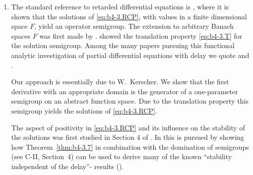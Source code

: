 \begin{enumerate}[label=\emph{Section \arabic*:}, wide, itemsep=1ex]
\item The standard reference to retarded differential equations is \citet{hale:1977}, where it is shown that the solutions of \eqref{eq:b4-3.RCP}, with values in a finite dimensional space $F$, yield an operator semigroup. 
The extension to arbitrary Banach spaces $F$ was first made by \citet{traviswebb:1974}. 
\citet{plant:1977} showed the translation property \eqref{eq:b4-3.T} for the solution semigroup. 
Among the many papers pursuing this functional analytic investigation of partial differential equations with delay we quote \citet{diblasioetal:1984} and \citet{kunischschappacher:1983}.

Our approach is essentially due to W.~Kerscher. 
We show that the first derivative with an appropriate domain is the generator of a one-parameter semigroup on an abstract function space. 
Due to the translation property this semigroup yields the solutions of \eqref{eq:b4-3.RCP}.

The aspect of positivity in \eqref{eq:b4-3.RCP} and its influence on the stability of the solutions was first studied in Section 4 of \citet{kerschernagel:1984}. 
In \citet{kerscher:1986} this is pursued by showing how Theorem~\ref{thm:b4-3.7} in combination with the domination of semigroups (see C-II, Section~4) can be used to derive many of the known \enquote{stability independent of the delay}- results (\eg  \citet{cookeferreira:1983}).
\end{enumerate}


{\RaggedRight

}

